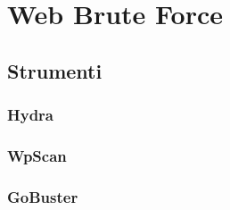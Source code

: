 \chapter{Web Brute Force}

\section{Strumenti}
\subsection{Hydra}
\subsection{WpScan}
\subsection{GoBuster}
\label{chap:conc}
